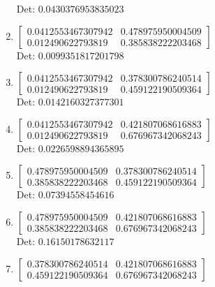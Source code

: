 \documentclass[12pt]{article}
\begin{document}
\begin{enumerate}
Det: $0.0430376953835023$\\

\item $\displaystyle \left[\begin{matrix}0.0412553467307942 & 0.478975950004509\\0.012490622793819 & 0.385838222203468\end{matrix}\right]$\\

Det: $0.0099351817201798$\\

\item $\displaystyle \left[\begin{matrix}0.0412553467307942 & 0.378300786240514\\0.012490622793819 & 0.459122190509364\end{matrix}\right]$\\

Det: $0.0142160327377301$\\

\item $\displaystyle \left[\begin{matrix}0.0412553467307942 & 0.421807068616883\\0.012490622793819 & 0.676967342068243\end{matrix}\right]$\\

Det: $0.0226598894365895$\\

\item $\displaystyle \left[\begin{matrix}0.478975950004509 & 0.378300786240514\\0.385838222203468 & 0.459122190509364\end{matrix}\right]$\\

Det: $0.07394558454616$\\

\item $\displaystyle \left[\begin{matrix}0.478975950004509 & 0.421807068616883\\0.385838222203468 & 0.676967342068243\end{matrix}\right]$\\

Det: $0.16150178632117$\\

\item $\displaystyle \left[\begin{matrix}0.378300786240514 & 0.421807068616883\\0.459122190509364 & 0.676967342068243\end{matrix}\right]$\\


\end{enumerate}
\end{document}
